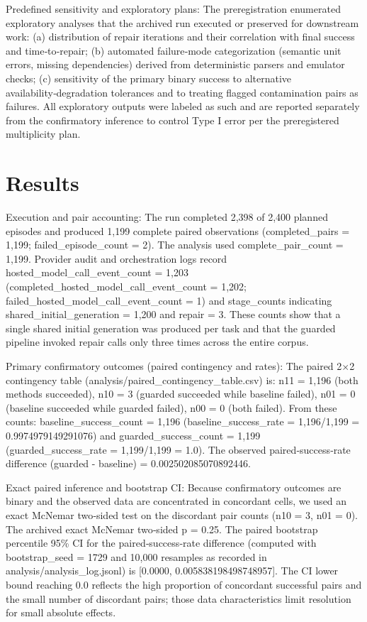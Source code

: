 \documentclass[conference]{IEEEtran}
\begin{document}
Predefined sensitivity and exploratory plans: The preregistration enumerated exploratory analyses that the archived run executed or preserved for downstream work: (a) distribution of repair iterations and their correlation with final success and time‑to‑repair; (b) automated failure‑mode categorization (semantic unit errors, missing dependencies) derived from deterministic parsers and emulator checks; (c) sensitivity of the primary binary success to alternative availability‑degradation tolerances and to treating flagged contamination pairs as failures. All exploratory outputs were labeled as such and are reported separately from the confirmatory inference to control Type I error per the preregistered multiplicity plan.

\section{Results}
Execution and pair accounting: The run completed 2,398 of 2,400 planned episodes and produced 1,199 complete paired observations (completed\_pairs = 1,199; failed\_episode\_count = 2). The analysis used complete\_pair\_count = 1,199. Provider audit and orchestration logs record hosted\_model\_call\_event\_count = 1,203 (completed\_hosted\_model\_call\_event\_count = 1,202; failed\_hosted\_model\_call\_event\_count = 1) and stage\_counts indicating shared\_initial\_generation = 1,200 and repair = 3. These counts show that a single shared initial generation was produced per task and that the guarded pipeline invoked repair calls only three times across the entire corpus.

Primary confirmatory outcomes (paired contingency and rates): The paired 2\ensuremath{\times}2 contingency table (analysis/paired\_contingency\_table.csv) is: n11 = 1,196 (both methods succeeded), n10 = 3 (guarded succeeded while baseline failed), n01 = 0 (baseline succeeded while guarded failed), n00 = 0 (both failed). From these counts: baseline\_success\_count = 1,196 (baseline\_success\_rate = 1,196/1,199 = 0.9974979149291076) and guarded\_success\_count = 1,199 (guarded\_success\_rate = 1,199/1,199 = 1.0). The observed paired‑success‑rate difference (guarded - baseline) = 0.002502085070892446.

Exact paired inference and bootstrap CI: Because confirmatory outcomes are binary and the observed data are concentrated in concordant cells, we used an exact McNemar two‑sided test on the discordant pair counts (n10 = 3, n01 = 0). The archived exact McNemar two‑sided p = 0.25. The paired bootstrap percentile 95\% CI for the paired‑success‑rate difference (computed with bootstrap\_seed = 1729 and 10,000 resamples as recorded in analysis/analysis\_log.jsonl) is [0.0000, 0.005838198498748957]. The CI lower bound reaching 0.0 reflects the high proportion of concordant successful pairs and the small number of discordant pairs; those data characteristics limit resolution for small absolute effects.
\end{document}
